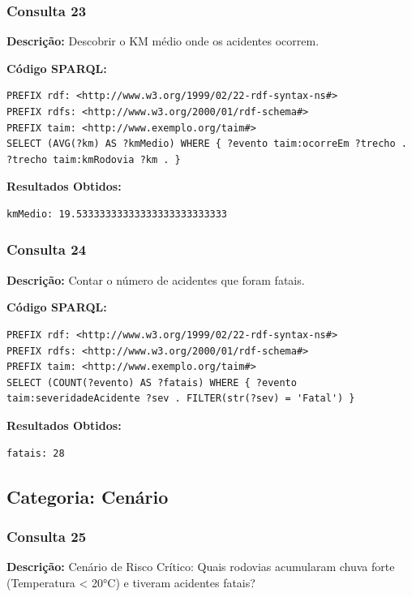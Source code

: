 \documentclass[12pt,a4paper]{article}
\begin{document}
\subsubsection*{Consulta 23}

\textbf{Descrição:} Descobrir o KM médio onde os acidentes ocorrem.

\textbf{Código SPARQL:}
\begin{lstlisting}
PREFIX rdf: <http://www.w3.org/1999/02/22-rdf-syntax-ns#>
PREFIX rdfs: <http://www.w3.org/2000/01/rdf-schema#>
PREFIX taim: <http://www.exemplo.org/taim#>
SELECT (AVG(?km) AS ?kmMedio) WHERE { ?evento taim:ocorreEm ?trecho . ?trecho taim:kmRodovia ?km . }
\end{lstlisting}

\textbf{Resultados Obtidos:}
\begin{lstlisting}
kmMedio: 19.53333333333333333333333333
\end{lstlisting}

\vspace{1cm}
\subsubsection*{Consulta 24}

\textbf{Descrição:} Contar o número de acidentes que foram fatais.

\textbf{Código SPARQL:}
\begin{lstlisting}
PREFIX rdf: <http://www.w3.org/1999/02/22-rdf-syntax-ns#>
PREFIX rdfs: <http://www.w3.org/2000/01/rdf-schema#>
PREFIX taim: <http://www.exemplo.org/taim#>
SELECT (COUNT(?evento) AS ?fatais) WHERE { ?evento taim:severidadeAcidente ?sev . FILTER(str(?sev) = 'Fatal') }
\end{lstlisting}

\textbf{Resultados Obtidos:}
\begin{lstlisting}
fatais: 28
\end{lstlisting}

\vspace{1cm}
\subsection*{Categoria: Cenário}

\subsubsection*{Consulta 25}

\textbf{Descrição:} Cenário de Risco Crítico: Quais rodovias acumularam chuva forte (Temperatura < 20°C) e tiveram acidentes fatais?
\end{document}
